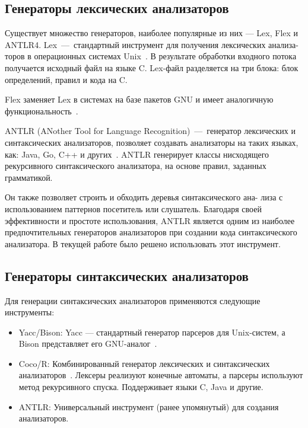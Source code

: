 
\subsection{Генераторы лексических анализаторов}

Существует множество генераторов, наиболее популярные из них — Lex, Flex и ANTLR4.
Lex~---~стандартный инструмент для получения лексических анализа- торов в операционных системах Unix~\cite{lesk1975lex}. В результате обработки входного потока получается исходный файл на языке C. Lex-файл разделяется на три блока: блок определений, правил и кода на C.

Flex заменяет Lex в системах на базе пакетов GNU и имеет аналогичную функциональность~\cite{sampath2007test}.

ANTLR (ANother Tool for Language Recognition)~---~генератор лексических и синтаксических анализаторов, позволяет создавать анализаторы на таких языках, как: Java, Go, C++ и других~\cite{parr2004s}.
ANTLR генерирует классы нисходящего рекурсивного синтаксического анализатора, на основе правил, заданных грамматикой.

Он также позволяет строить и обходить деревья синтаксического ана- лиза с использованием паттернов посетитель или слушатель. Благодаря своей эффективности и простоте использования, ANTLR является одним из наиболее предпочтительных генераторов анализаторов при создании кода синтаксического анализатора. В текущей работе было решено использовать этот инструмент.

\subsection{Генераторы синтаксических анализаторов}

Для генерации синтаксических анализаторов применяются следующие инструменты:
\begin{itemize}
    \item Yacc/Bison: Yacc — стандартный генератор парсеров для Unix-систем, а Bison представляет его GNU-аналог~\cite{bhamidipaty1998very}.
    
    \item Coco/R: Комбинированный генератор лексических и синтаксических анализаторов~\cite{mossenbock1990coco}. Лексеры реализуют конечные автоматы, а парсеры используют метод рекурсивного спуска. Поддерживает языки C, Java и другие.
    
    \item ANTLR: Универсальный инструмент (ранее упомянутый) для создания анализаторов.
\end{itemize}


